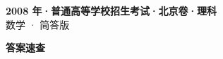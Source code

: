 \documentclass[zihao=-4, a4paper]{ctexart}
\begin{document}
\begin{center}
  {\Large\bfseries 2008 年·普通高等学校招生考试·北京卷·理科}\\[4pt]
  {\large 数学 · 简答版}
\end{center}
\medskip
{}

\clearpage
{}
\begin{center}{\Large\bfseries 答案速查}\end{center}
\medskip

\end{document}
